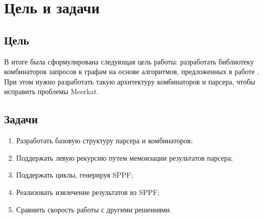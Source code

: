 \chapter{Цель и задачи}
\label{ch:ch2}

\section{Цель}
В итоге была сформулирована следующая цель работы: разработать библиотеку комбинаторов запросов к графам
на основе алгоритмов, предложенных в работе \cite{Meerkat}. При этом нужно разработать такую архитектуру комбинаторов и парсера, чтобы исправить проблемы Meerkat.
\section{Задачи}
\begin{enumerate}
    \item Разработать базовую структуру парсера и комбинаторов;
    \item Поддержать левую рекурсию путем мемоизации результатов парсера;
    \item Поддержать циклы, генерируя SPPF;
    \item Реализовать извлечение результатов из SPPF;
    \item Сравнить скорость работы с другими решениями.
\end{enumerate} 
